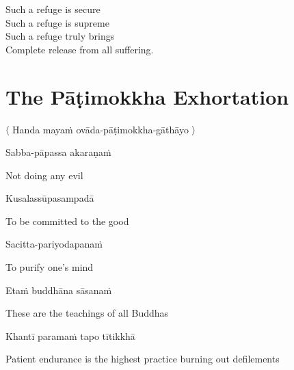 \begin{english-verses}
  Such a refuge is secure\\
  Such a refuge is supreme\\
  Such a refuge truly brings\\
  Complete release from all suffering.
\end{english-verses}

\suttaRef{[Dhp 188-192]}


\section{The Pāṭimokkha Exhortation}
\label{patimokkha-exhortation}

\begin{leader}
  〈 Handa mayaṁ ovāda-pāṭimokkha-gāthāyo 〉

\end{leader}

Sabba-pāpassa akaraṇaṁ

\begin{english}
  Not doing any evil
\end{english}

Kusalassūpasampadā

\begin{english}
  To be committed to the good
\end{english}

Sacitta-pariyodapanaṁ

\begin{english}
  To purify one's mind
\end{english}

Etaṁ buddhāna sāsanaṁ

\begin{english}
  These are the teachings of all Buddhas
\end{english}

Khantī paramaṁ tapo tītikkhā

\begin{english}
  Patient endurance is the highest practice burning out defilements
\end{english}

